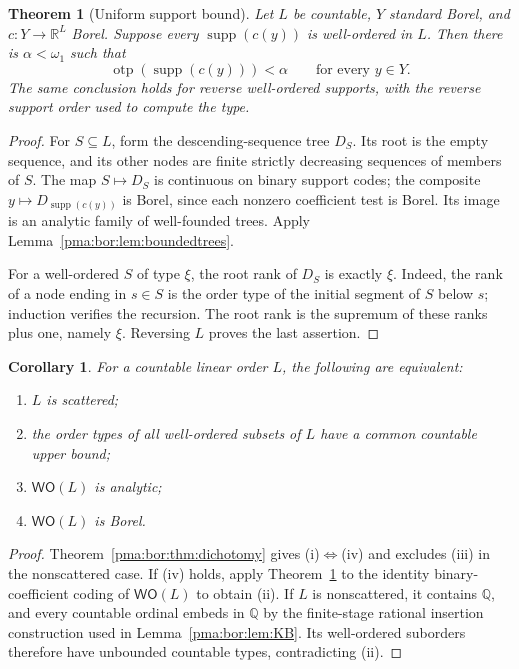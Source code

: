 \documentclass[11pt]{article}
\numberwithin{equation}{section}
\newtheorem{theorem}{Theorem}[section]
\newtheorem{corollary}[corollary]{Corollary}
\theoremstyle{definition}
\theoremstyle{remark}
\newcommand{\Q}{\mathbb Q}
\newcommand{\R}{\mathbb R}
\newcommand{\supp}{\operatorname{supp}}
\newcommand{\WO}{\mathsf{WO}}
\newcommand{\otp}{\operatorname{otp}}
\begin{document}
\begin{theorem}[Uniform support bound]
\label{pma:bor:thm:bounded}
Let $L$ be countable, $Y$ standard Borel, and
$c:Y\to\R^L$ Borel. Suppose every $\supp(c(y))$ is well-ordered in $L$.
Then there is $\alpha<\omega_1$ such that
\[
 \otp(\supp(c(y)))<\alpha\qquad\text{for every }y\in Y.
\]
The same conclusion holds for reverse well-ordered supports, with the reverse
support order used to compute the type.
\end{theorem}
\begin{proof}
For $S\subseteq L$, form the descending-sequence tree $D_S$. Its root is the
empty sequence, and its other nodes are finite strictly decreasing sequences
of members of $S$. The map $S\mapsto D_S$ is continuous on binary support
codes; the composite $y\mapsto D_{\supp(c(y))}$ is Borel, since each nonzero
coefficient test is Borel. Its image is an analytic family of well-founded
trees. Apply Lemma~\ref{pma:bor:lem:boundedtrees}.

For a well-ordered $S$ of type $\xi$, the root rank of $D_S$ is exactly $\xi$.
Indeed, the rank of a node ending in $s\in S$ is the order type of the
initial segment of $S$ below $s$; induction verifies the recursion. The root
rank is the supremum of these ranks plus one, namely $\xi$.
Reversing $L$ proves the last assertion.
\end{proof}

\begin{corollary}
\label{pma:bor:cor:rankversion}
For a countable linear order $L$, the following are equivalent:
\begin{enumerate}[label=(\roman*)]
\item $L$ is scattered;
\item the order types of all well-ordered subsets of $L$ have a common
countable upper bound;
\item $\WO(L)$ is analytic;
\item $\WO(L)$ is Borel.
\end{enumerate}
\end{corollary}
\begin{proof}
Theorem~\ref{pma:bor:thm:dichotomy} gives (i)$\Leftrightarrow$(iv) and excludes
(iii) in the nonscattered case. If (iv) holds, apply
Theorem~\ref{pma:bor:thm:bounded} to the identity binary-coefficient coding of
$\WO(L)$ to obtain (ii). If $L$ is nonscattered, it contains $\Q$, and every
countable ordinal embeds in $\Q$ by the finite-stage rational insertion
construction used in Lemma~\ref{pma:bor:lem:KB}. Its well-ordered suborders therefore
have unbounded countable types, contradicting (ii).
\end{proof}
\end{document}
